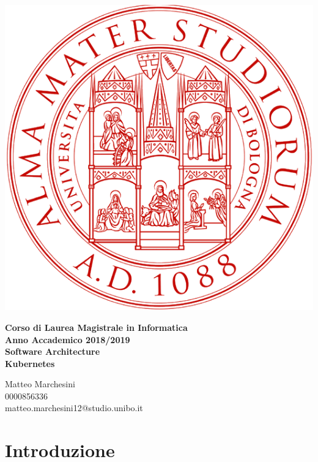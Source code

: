 \documentclass[12pt, a4paper]{report}
\begin{document}
\begin{titlepage}
\vspace{15mm}
\begin{center}
  \includegraphics{Images/uniboLogo}
\end{center}
\begin{center}
{\normalsize{\bf Corso di Laurea Magistrale in Informatica}}\\
\vspace{5mm}
{\normalsize{\bf Anno Accademico 2018/2019}}\\
\vspace{20mm}
{\Large{\bf Software Architecture}}\\
\vspace{10mm}
{\Huge{\bf Kubernetes}}\\
\vspace{25mm}
\end{center}
\begin{center}
{\large{Matteo Marchesini\\0000856336\\matteo.marchesini12@studio.unibo.it}}
\end{center}
\end{titlepage}
\tableofcontents
\chapter{Introduzione}
\end{document}
